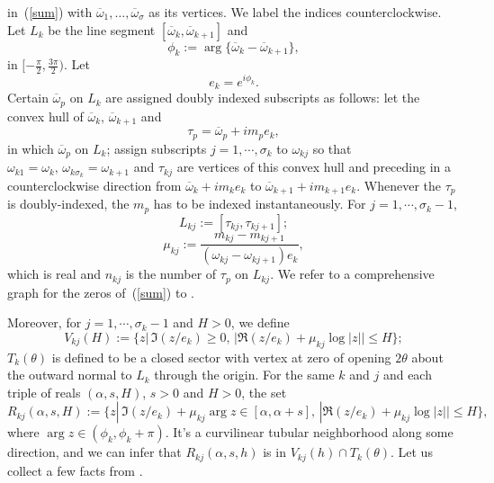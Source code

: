 \documentclass[10pt,a4paper]{article}
\theoremstyle{plain}
\theoremstyle{definition}
\theoremstyle{remark}
\numberwithin{equation}{section}
\begin{document}
in~(\ref{sum}) with
$\overline{\omega}_1,\ldots,\overline{\omega}_\sigma$ as its
vertices. We label the indices counterclockwise. Let $L_k$ be
the line segment $[\overline{\omega}_k,\overline{\omega}_{k+1}]$
and
$$\phi_k:=\arg\{\overline{\omega}_k-\overline{\omega}_{k+1}\},$$ in
$[-\frac{\pi}{2},\frac{3\pi}{2})$. Let
\begin{equation}\label{EK}
e_k=e^{i\phi_k}.
\end{equation}
Certain $\overline{\omega}_p$ on $L_k$ are assigned doubly indexed
subscripts as follows: let the convex hull of
$\overline{\omega}_{k},\,\overline{\omega}_{k+1}$ and
\begin{equation}\label{tau}
\tau_p=\overline{\omega}_p+im_pe_k,
\end{equation}
in which
$\overline{\omega}_p$ on $L_k$; assign subscripts
$j=1,\cdots,\sigma_k$ to $\omega_{kj}$ so that
$\omega_{k1}=\omega_k,\,\omega_{k\sigma_k}=\omega_{k+1}$ and
$\tau_{kj}$ are vertices of this convex hull and preceding in a
counterclockwise direction from $\overline{\omega}_k+im_ke_k$ to
$\overline{\omega}_{k+1}+im_{k+1}e_k$. Whenever the $\tau_p$ is doubly-indexed, the $m_p$ has to be indexed instantaneously. For
$j=1,\cdots,\sigma_{k}-1$,
$$L_{kj}:=[\tau_{kj},\tau_{kj+1}];$$
\begin{equation} \label{mu}
\mu_{kj}:=\frac{m_{kj}-m_{kj+1}}{(\omega_{kj}-\omega_{kj+1})e_k},
\end{equation}
which is real and $n_{kj}$ is the number of $\tau_p$ on $L_{kj}$.
We refer to a comprehensive graph for the zeros of~(\ref{sum}) to \cite[p.\,10]{Dickson2}.
\par
Moreover, for  $j=1,\cdots,\sigma_{k}-1$ and $H>0$, we define
\begin{equation}\label{V}
V_{kj}(H):=\{z|\,\Im(z/e_k)\geq0,\,|\Re(z/e_k)+\mu_{kj}\log|z||\leq
H\};
\end{equation}
$T_k(\theta)$ is defined to be a closed sector with vertex at zero
of opening $2\theta$ about the outward normal to $L_k$ through the
origin. For the same $k$ and $j$ and each triple of reals
$(\alpha,s,H)$, $s>0$ and $H>0$, the set
\begin{equation}\nonumber
R_{kj}(\alpha,s,H):=\{z|\,\Im(z/e_k)+\mu_{kj}\arg
z\in[\alpha,\alpha+s],\,|\Re(z/e_k)+\mu_{kj}\log|z||\leq H\},
\end{equation}
where $\arg z\in(\phi_k,\phi_k+\pi)$. It's a curvilinear tubular
neighborhood along some direction, and we can infer that $R_{kj}(\alpha,s,h)$ is in $V_{kj}(h)\cap T_k(\theta)$.
Let us collect a few facts from \cite{Dickson,Dickson2}.
\end{document}
